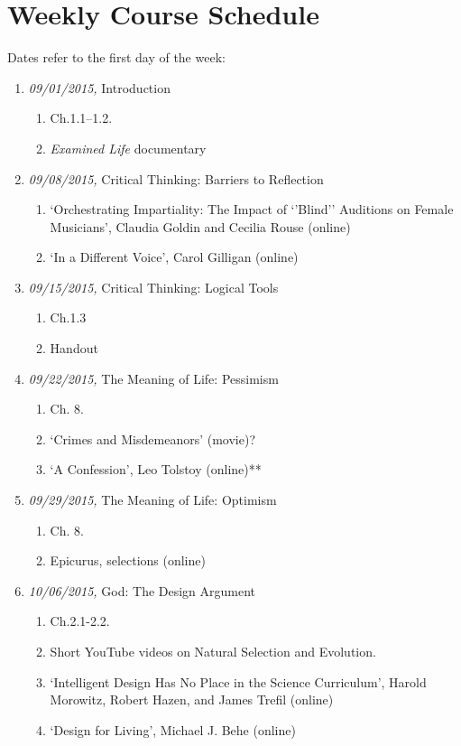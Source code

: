 \documentclass[11pt,article,oneside]{memoir}
\begin{document}
\section{Weekly Course Schedule}
Dates refer to the first day of the week: 
\begin{enumerate}

\item \textit{09/01/2015,} Introduction
\begin{enumerate}
\item Ch.1.1--1.2.
\item \emph{Examined Life} documentary
\end{enumerate}

\item \textit{09/08/2015,} Critical Thinking: Barriers to Reflection
\begin{enumerate}
\item `Orchestrating Impartiality: The Impact of `'Blind'' Auditions on Female Musicians',  Claudia Goldin and Cecilia Rouse (online)
\item `In a Different Voice',  Carol Gilligan (online)
\end{enumerate}

\item \textit{09/15/2015,} Critical Thinking: Logical Tools 
\begin{enumerate}
\item Ch.1.3
\item Handout
\end{enumerate}

\item \textit{09/22/2015,} The Meaning of Life: Pessimism 
\begin{enumerate}
\item Ch. 8. 
\item `Crimes and Misdemeanors' (movie)?
\item `A Confession', Leo Tolstoy (online)**
\end{enumerate}

\item \textit{09/29/2015,} The Meaning of Life: Optimism
\begin{enumerate}
\item Ch. 8. 
\item Epicurus, selections (online)
\end{enumerate}

\item \textit{10/06/2015,} God: The Design Argument
\begin{enumerate}
\item Ch.2.1-2.2. 
\item Short YouTube videos on Natural Selection and Evolution.
\item `Intelligent Design Has No Place in the Science Curriculum', Harold Morowitz, Robert Hazen, and James Trefil (online)
 \item `Design for Living', Michael J. Behe (online)
 \end{enumerate}
 

\end{enumerate}
\end{document}
